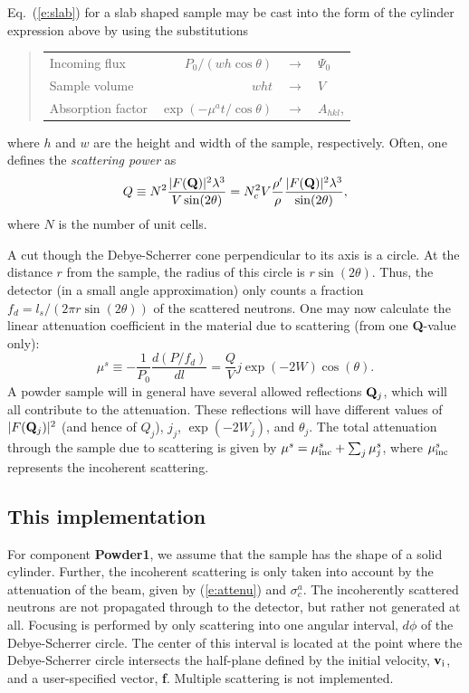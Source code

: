 %
Eq.\ (\ref{e:slab}) for a slab shaped sample
may be cast into the form of the cylinder expression above
by using the substitutions
%
\begin{quote}\begin{tabular}{lrcl}
Incoming flux & $P_0 / (w h \cos\theta)$ & $\rightarrow$ & $\Psi_0$ \\
Sample volume & $w h t$ & $\rightarrow$ & $V$ \\
Absorption factor & $\exp(-\mu^a t / \cos\theta)$ & $\rightarrow$ & $A_{hkl}$, \\
\end{tabular}\end{quote}
%
where $h$ and $w$ are the height and width of the sample, respectively.
Often, one defines the {\em scattering power} as
\begin{equation}
Q \equiv N^2 \frac{|F({\bf Q})|^2 \lambda^3}{V \sin(2\theta)}
 = N_c^2 V \frac{\rho'}{\rho} \frac{|F({\bf Q})|^2 \lambda^3}{\sin(2\theta)} ,
\end{equation}
where $N$ is the number of unit cells.

A cut though the Debye-Scherrer cone perpendicular to its axis
is a circle. At the distance $r$ from the sample, the radius of this
circle is $r \sin(2\theta)$. Thus, the detector (in a small angle
approximation) only counts a fraction $f_d = l_s / (2 \pi r \sin(2 \theta))$
of the scattered neutrons.
One may now calculate the
linear attenuation coefficient in the material due to scattering
(from one {\bf Q}-value only):
\begin{equation}
\label{e:attenu}
\mu^s \equiv -\frac{1}{P_0} \frac{d(P/f_d)}{dl}
  = \frac{Q}{V} j \exp(-2W) \cos(\theta) .
\end{equation}
A powder sample will in general have several allowed reflections 
${\bf Q}_j$, which will all contribute to the attenuation. 
These reflections will have different values of 
$|F({\bf Q}_j)|^2$ (and hence of $Q_j$), $j_j$, $\exp(-2W_j)$, 
and $\theta_j$.
The total attenuation through the sample due to scattering is given by
$\mu^s = \mu_{\rm inc}^s + \sum_j \mu^s_j $, 
where $\mu_{\rm inc}^s$ represents the incoherent scattering.

\subsection{This implementation}
For component {\bf Powder1}, we assume that the sample 
has the shape of a solid cylinder. 
Further, the incoherent scattering is only taken into account
by the attenuation of the beam, given by (\ref{e:attenu}) 
and $\sigma_c^a$.
The incoherently scattered neutrons are not
propagated through to the detector, but rather not generated at all.
Focusing is performed by only scattering into one angular
interval, $d\phi$ of the Debye-Scherrer circle. The center of this
interval is located at the point where the Debye-Scherrer circle
intersects the half-plane defined by the initial velocity, ${\bf v}_{\rm i}$,
and a user-specified vector, {\bf f}. 
Multiple scattering is not implemented.

